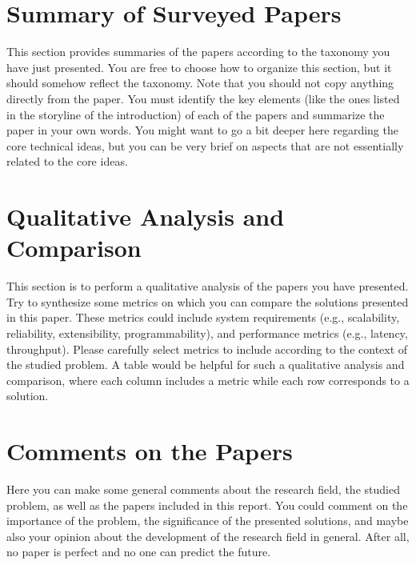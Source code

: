 \documentclass[report]{template-core/upb-cn}
\begin{document}
\section{Summary of Surveyed Papers}
\label{sec:papers}

This section provides summaries of the papers according to the taxonomy you have just presented. You are free to choose how to organize this section, but it should somehow reflect the taxonomy. Note that you should not copy anything directly from the paper. You must identify the key elements (like the ones listed in the storyline of the introduction) of each of the papers and summarize the paper in your own words. You might want to go a bit deeper here regarding the core technical ideas, but you can be very brief on aspects that are not essentially related to the core ideas.

\section{Qualitative Analysis and Comparison}
\label{sec:analysis}

This section is to perform a qualitative analysis of the papers you have presented. Try to synthesize some metrics on which you can compare the solutions presented in this paper. These metrics could include system requirements (e.g., scalability, reliability, extensibility, programmability), and performance metrics (e.g., latency, throughput). Please carefully select metrics to include according to the context of the studied problem. A table would be helpful for such a qualitative analysis and comparison, where each column includes a metric while each row corresponds to a solution.

\section{Comments on the Papers}
\label{sec:comments}

Here you can make some general comments about the research field, the studied problem, as well as the papers included in this report. You could comment on the importance of the problem, the significance of the presented solutions, and maybe also your opinion about the development of the research field in general. After all, no paper is perfect and no one can predict the future. 
\end{document}
